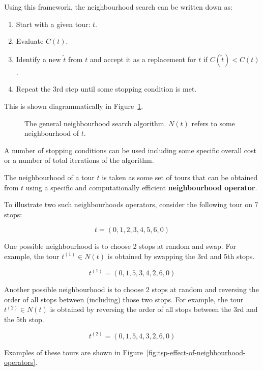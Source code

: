 Using this framework, the neighbourhood search can be written down as:

\begin{enumerate}
    \item Start with a given tour: \(t\).
    \item Evaluate \(C(t)\).
    \item Identify a new \(\tilde t\) from \(t\) and accept it as a replacement
        for \(t\) if \(C(\tilde t)< C(t)\).
    \item Repeat the 3rd step until some stopping condition is met.
\end{enumerate}

This is shown diagrammatically in Figure~\ref{fig:tsp}.

\begin{figure}[!hbtp]
    \begin{center}
        
    \end{center}
    \caption{The general neighbourhood search algorithm. \(N(t)\) refers to some
    neighbourhood of \(t\).}
    \label{fig:tsp}
\end{figure}

A number of stopping conditions can be used including some specific
overall cost or a number of total iterations of the algorithm.

The neighbourhood of a tour \(t\) is taken as some set of tours that can be
obtained from \(t\) using a specific and computationally efficient \textbf{neighbourhood
operator}.

To illustrate two such neighbourhoods operators, consider the following tour on
7 stops:

\[
    t = (0, 1, 2, 3, 4, 5, 6, 0)
\]

One possible neighbourhood is to choose 2 stops at random and swap. For
example, the tour \(t^{(1)}\in N(t)\) is obtained by swapping the 3rd and 5th
stops.

\[
    t^{(1)} = (0, 1, 5, 3, 4, 2, 6, 0)
\]

Another possible neighbourhood is to choose 2 stops at random and reversing the
order
of all stops between (including) those two stops. For example, the tour
\(t^{(2)} \in N(t)\) is obtained by reversing the order of all stops between
the 3rd and the 5th stop.

\[
    t^{(2)} = (0, 1, 5, 4, 3, 2, 6, 0)
\]

Examples of these tours are shown in
Figure~\ref{fig:tsp-effect-of-neighbourhood-operators}.


